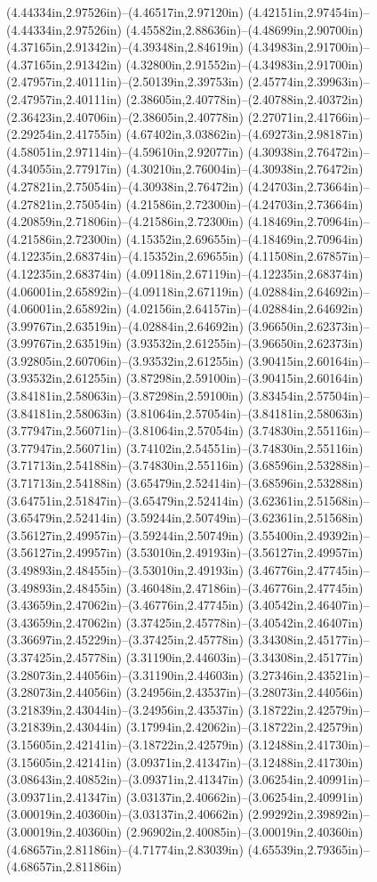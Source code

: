 (4.44334in,2.97526in)--(4.46517in,2.97120in) (4.42151in,2.97454in)--(4.44334in,2.97526in) (4.45582in,2.88636in)--(4.48699in,2.90700in) (4.37165in,2.91342in)--(4.39348in,2.84619in) (4.34983in,2.91700in)--(4.37165in,2.91342in) (4.32800in,2.91552in)--(4.34983in,2.91700in) (2.47957in,2.40111in)--(2.50139in,2.39753in) (2.45774in,2.39963in)--(2.47957in,2.40111in) (2.38605in,2.40778in)--(2.40788in,2.40372in) (2.36423in,2.40706in)--(2.38605in,2.40778in) (2.27071in,2.41766in)--(2.29254in,2.41755in) (4.67402in,3.03862in)--(4.69273in,2.98187in) (4.58051in,2.97114in)--(4.59610in,2.92077in) (4.30938in,2.76472in)--(4.34055in,2.77917in) (4.30210in,2.76004in)--(4.30938in,2.76472in) (4.27821in,2.75054in)--(4.30938in,2.76472in) (4.24703in,2.73664in)--(4.27821in,2.75054in) (4.21586in,2.72300in)--(4.24703in,2.73664in) (4.20859in,2.71806in)--(4.21586in,2.72300in) (4.18469in,2.70964in)--(4.21586in,2.72300in) (4.15352in,2.69655in)--(4.18469in,2.70964in) (4.12235in,2.68374in)--(4.15352in,2.69655in) (4.11508in,2.67857in)--(4.12235in,2.68374in) (4.09118in,2.67119in)--(4.12235in,2.68374in) (4.06001in,2.65892in)--(4.09118in,2.67119in) (4.02884in,2.64692in)--(4.06001in,2.65892in) (4.02156in,2.64157in)--(4.02884in,2.64692in) (3.99767in,2.63519in)--(4.02884in,2.64692in) (3.96650in,2.62373in)--(3.99767in,2.63519in) (3.93532in,2.61255in)--(3.96650in,2.62373in) (3.92805in,2.60706in)--(3.93532in,2.61255in) (3.90415in,2.60164in)--(3.93532in,2.61255in) (3.87298in,2.59100in)--(3.90415in,2.60164in) (3.84181in,2.58063in)--(3.87298in,2.59100in) (3.83454in,2.57504in)--(3.84181in,2.58063in) (3.81064in,2.57054in)--(3.84181in,2.58063in) (3.77947in,2.56071in)--(3.81064in,2.57054in) (3.74830in,2.55116in)--(3.77947in,2.56071in) (3.74102in,2.54551in)--(3.74830in,2.55116in) (3.71713in,2.54188in)--(3.74830in,2.55116in) (3.68596in,2.53288in)--(3.71713in,2.54188in) (3.65479in,2.52414in)--(3.68596in,2.53288in) (3.64751in,2.51847in)--(3.65479in,2.52414in) (3.62361in,2.51568in)--(3.65479in,2.52414in) (3.59244in,2.50749in)--(3.62361in,2.51568in) (3.56127in,2.49957in)--(3.59244in,2.50749in) (3.55400in,2.49392in)--(3.56127in,2.49957in) (3.53010in,2.49193in)--(3.56127in,2.49957in) (3.49893in,2.48455in)--(3.53010in,2.49193in) (3.46776in,2.47745in)--(3.49893in,2.48455in) (3.46048in,2.47186in)--(3.46776in,2.47745in) (3.43659in,2.47062in)--(3.46776in,2.47745in) (3.40542in,2.46407in)--(3.43659in,2.47062in) (3.37425in,2.45778in)--(3.40542in,2.46407in) (3.36697in,2.45229in)--(3.37425in,2.45778in) (3.34308in,2.45177in)--(3.37425in,2.45778in) (3.31190in,2.44603in)--(3.34308in,2.45177in) (3.28073in,2.44056in)--(3.31190in,2.44603in) (3.27346in,2.43521in)--(3.28073in,2.44056in) (3.24956in,2.43537in)--(3.28073in,2.44056in) (3.21839in,2.43044in)--(3.24956in,2.43537in) (3.18722in,2.42579in)--(3.21839in,2.43044in) (3.17994in,2.42062in)--(3.18722in,2.42579in) (3.15605in,2.42141in)--(3.18722in,2.42579in) (3.12488in,2.41730in)--(3.15605in,2.42141in) (3.09371in,2.41347in)--(3.12488in,2.41730in) (3.08643in,2.40852in)--(3.09371in,2.41347in) (3.06254in,2.40991in)--(3.09371in,2.41347in) (3.03137in,2.40662in)--(3.06254in,2.40991in) (3.00019in,2.40360in)--(3.03137in,2.40662in) (2.99292in,2.39892in)--(3.00019in,2.40360in) (2.96902in,2.40085in)--(3.00019in,2.40360in) (4.68657in,2.81186in)--(4.71774in,2.83039in) (4.65539in,2.79365in)--(4.68657in,2.81186in) 